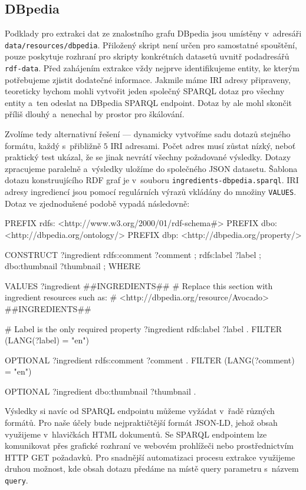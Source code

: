 \subsection{DBpedia}

Podklady pro extrakci dat ze znalostního grafu DBpedia jsou umístěny v~adresáři \texttt{data/resources/dbpedia}. Přiložený skript není určen pro samostatné spouštění, pouze poskytuje rozhraní pro skripty konkrétních datasetů uvnitř podadresářů \texttt{rdf-data}. Před zahájením extrakce vždy nejprve identifikujeme entity, ke kterým potřebujeme zjistit dodatečné informace. Jakmile máme IRI adresy připraveny, teoreticky bychom mohli vytvořit jeden společný SPARQL dotaz pro všechny entity a~ten odeslat na DBpedia SPARQL endpoint. Dotaz by ale mohl skončit příliš dlouhý a~nenechal by prostor pro škálování.

Zvolíme tedy alternativní řešení --- dynamicky vytvoříme sadu dotazů stejného formátu, každý s~přibližně $5$ IRI adresami. Počet adres musí zůstat nízký, neboť praktický test ukázal, že se jinak nevrátí všechny požadované výsledky. Dotazy zpracujeme paralelně a~výsledky uložíme do společného JSON datasetu. Šablona dotazu konstruujícího RDF graf je v~souboru \texttt{ingredients-dbpedia.sparql}. IRI adresy ingrediencí jsou pomocí regulárních výrazů vkládány do množiny \texttt{VALUES}. Dotaz ve zjednodušené podobě vypadá následovně:

\begin{code}
PREFIX rdfs: <http://www.w3.org/2000/01/rdf-schema#>
PREFIX dbo: <http://dbpedia.org/ontology/>
PREFIX dbp: <http://dbpedia.org/property/>

CONSTRUCT {
    ?ingredient rdfs:comment ?comment ;
                rdfs:label ?label ;
                dbo:thumbnail ?thumbnail ;
}
WHERE {
    VALUES ?ingredient { 
        ##INGREDIENTS## 
        # Replace this section with ingredient resources such as:
        # <http://dbpedia.org/resource/Avocado>
        ##INGREDIENTS##
    }

    # Label is the only required property
    ?ingredient rdfs:label ?label .
    FILTER (LANG(?label) = "en")
    
    OPTIONAL {
        ?ingredient rdfs:comment ?comment .
        FILTER (LANG(?comment) = "en")
    }

    OPTIONAL {?ingredient dbo:thumbnail ?thumbnail .}
}
\end{code}

Výsledky si navíc od SPARQL endpointu můžeme vyžádat v~řadě různých formátů. Pro naše účely bude nejpraktičtější formát JSON-LD, jehož obsah využijeme v~hlavičkách HTML dokumentů. Se SPARQL endpointem lze komunikovat přes grafické rozhraní ve webovém prohlížeči nebo prostřednictvím HTTP GET požadavků. Pro snadnější automatizaci procesu extrakce využijeme druhou možnost, kde obsah dotazu předáme na místě query parametru s~názvem \texttt{query}. 

